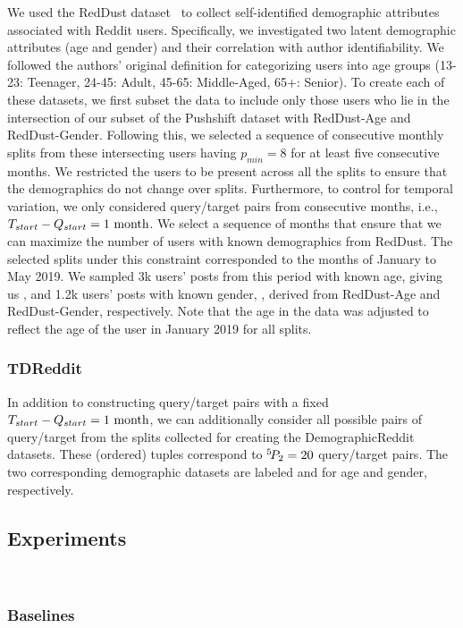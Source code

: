 We used the RedDust dataset~\cite{tigunova2020reddust} to collect self-identified demographic attributes associated with Reddit users. 
Specifically, we investigated two latent demographic attributes (age and gender) and their correlation with author identifiability.
We followed the authors' original definition for categorizing users into age groups (13-23: Teenager, 24-45: Adult, 45-65: Middle-Aged, 65+: Senior).
To create each of these datasets, we first subset the data to include only those users who lie in the intersection of our subset of the Pushshift dataset with RedDust-Age and RedDust-Gender. 
Following this, we selected a sequence of consecutive monthly splits from these intersecting users having $p_{min} = 8$ for at least five consecutive months. 
We restricted the users to be present across all the splits to ensure that the demographics do not change over splits.
Furthermore, to control for temporal variation, we only considered query/target pairs from consecutive months, i.e., $T_{start} - Q_{start} = 1~\rm{month}$.
We select a sequence of months that ensure that we can maximize the number of users with known demographics from RedDust.
The selected splits under this constraint corresponded to the months of January to May 2019.
We sampled 3k users' posts from this period with known age, giving us \DSagefixed{}, and 1.2k users' posts with known gender, \DSgenderfixed{}, derived from RedDust-Age and RedDust-Gender, respectively.
Note that the age in the data was adjusted to reflect the age of the user in January 2019 for all splits.

\subsubsection{TDReddit}
In addition to constructing query/target pairs with a fixed $T_{start} - Q_{start} = 1~\rm{month}$, we can additionally consider all possible pairs of query/target from the splits collected for creating the DemographicReddit datasets.
These (ordered) tuples correspond to ${}^{5}\!P_{2} = 20$ query/target pairs.
The two corresponding demographic datasets are labeled \DSagevary{} and \DSgendervary{} for age and gender, respectively.

\subsection{Experiments}\

\subsubsection{Baselines}

